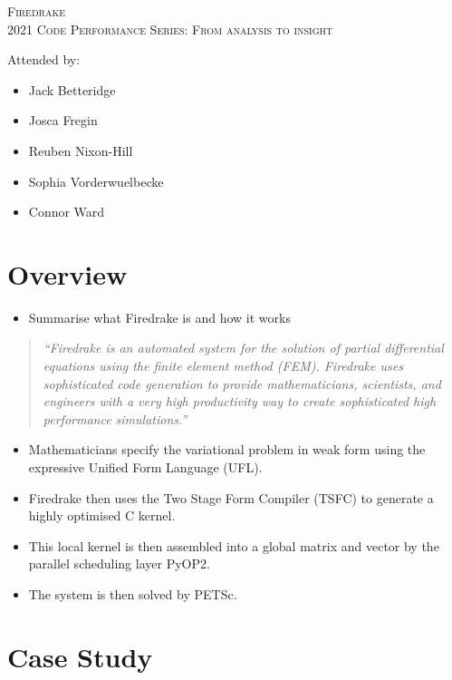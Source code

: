 \documentclass[a4paper,11pt]{article}
\author{Jack Betteridge}
\newenvironment{jacknotes}{\color{red}\renewcommand{\labelitemi}{$\star$}\begin{itemize}}{\end{itemize}}
\begin{document}
\begin{center}
\textsc{\Large Firedrake}\\
\textsc{2021 Code Performance Series: From analysis to insight}
\end{center}

Attended by:
\begin{itemize}
	\item Jack Betteridge
	\item Josca Fregin
	\item Reuben Nixon-Hill
	\item Sophia Vorderwuelbecke
	\item Connor Ward
\end{itemize}

\section{Overview}
\label{sec:overview}
\begin{jacknotes}
	\item Summarise what Firedrake is and how it works
\end{jacknotes}
\begin{quote}
\emph{``Firedrake is an automated system for the solution of partial differential equations using the finite element method (FEM). Firedrake uses sophisticated code generation to provide mathematicians, scientists, and engineers with a very high productivity way to create sophisticated high performance simulations.''}
\end{quote}

\begin{itemize}
    \item Mathematicians specify the variational problem in weak form using the expressive Unified Form Language (UFL).
    \item Firedrake then uses the Two Stage Form Compiler (TSFC) to generate a highly optimised C kernel.
    \item This local kernel is then assembled into a global matrix and vector by the parallel scheduling layer PyOP2.
    \item The system is then solved by PETSc.
\end{itemize}

\section{Case Study}
\label{sec:case}
\end{document}
